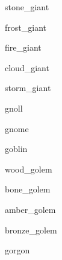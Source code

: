 \documentclass[letterpaper,serif]{module}
\begin{document}
\begin{newmonster}{stone_giant}\end{newmonster}

\begin{newmonster}{frost_giant}\end{newmonster}

\begin{newmonster}{fire_giant}\end{newmonster}

\begin{newmonster}{cloud_giant}\end{newmonster}

\begin{newmonster}{storm_giant}\end{newmonster}

\begin{newmonster}{gnoll}\end{newmonster}

\begin{newmonster}{gnome}\end{newmonster}

\begin{newmonster}{goblin}\end{newmonster}


\begin{newmonster}{wood_golem}\end{newmonster}

\begin{newmonster}{bone_golem}\end{newmonster}

\begin{newmonster}{amber_golem}\end{newmonster}

\begin{newmonster}{bronze_golem}\end{newmonster}

\begin{newmonster}{gorgon}\end{newmonster}
\end{document}
